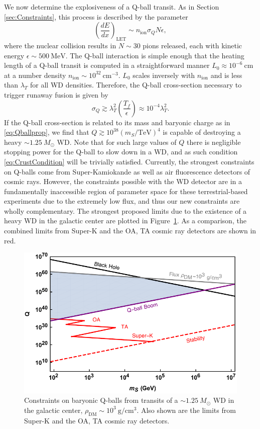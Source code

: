 \documentclass[twocolumn,showpacs,preprintnumbers,amsmath,amssymb,prd]{revtex4}
\def\r{\right)}
\def\l{\left(}
\begin{document}
We now determine the explosiveness of a Q-ball transit. 
As in Section \ref{sec:Constraints}, this process is described by the parameter
\begin{equation}
\l\frac{dE}{dx}\r_\text{LET} \sim n_\text{ion} \sigma_Q N \epsilon,
\end{equation}
where the nuclear collision results in $N \sim 30$ pions released, each with kinetic energy $\epsilon \sim 500 ~\text{MeV}$.
The Q-ball interaction is simple enough that the heating length of a Q-ball transit is computed in a straightforward manner $L_0 \approx 10^{-6} ~\text{cm}$ at a number density $n_\text{ion} \sim 10^{32}~\text{cm}^{-3}$. 
$L_0$ scales inversely with $n_\text{ion}$ and is less than $\lambda_T$ for all WD densities. 
Therefore, the Q-ball cross-section necessary to trigger runaway fusion is given by
\begin{equation}
\sigma_Q \gtrsim \lambda_T^2 \l \frac{T_f}{\epsilon}\r \approx 10^{-4} \lambda_T^2.
\end{equation}
If the Q-ball cross-section is related to its mass and baryonic charge as in \eqref{eq:Qballprop}, we find that $Q \gtrsim 10^{38} (m_S/\text{TeV})^4$ is capable of destroying a heavy $\sim 1.25 ~M_{\odot}$ WD.
Note that for such large values of $Q$ there is negligible stopping power for the Q-ball to slow down in a WD, and as such condition \eqref{eq:CrustCondition} will be trivially satisfied.
Currently, the strongest constraints on Q-balls come from Super-Kamiokande as well as air fluorescence detectors of cosmic rays.
However, the constraints possible with the WD detector are in a fundamentally inaccessible region of parameter space for these terrestrial-based experiments due to the extremely low flux, and thus our new constraints are wholly complementary.
The strongest proposed limits due to the existence of a heavy WD in the galactic center are plotted in Figure~\ref{fig:Qballconstraint}. As a comparison, the combined limits from Super-K and the OA, TA cosmic ray detectors are shown in red. 
\begin{figure}
\includegraphics[scale=.55]{Qballconstraint.pdf}
\caption{Constraints on baryonic Q-balls from transits of a $\sim 1.25 ~M_{\odot}$ WD in the galactic center, $\rho_\text{DM} \sim 10^3 ~\text{g}/\text{cm}^3$. Also shown are the limits from Super-K and the OA, TA cosmic ray detectors.}
\label{fig:Qballconstraint}
\end{figure}
\end{document}
